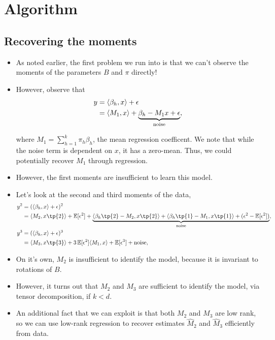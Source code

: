 \documentclass[tablecaption=bottom]{jmlr}
\begin{document}
\section{Algorithm}

\subsection{Recovering the moments}

\begin{itemize}
\item
  As noted earlier, the first problem we run into is that we can't
  observe the moments of the parameters $B$ and $\pi$ directly!
\item
  However, observe that
  \begin{align}
    y &= \langle \beta_h, x \rangle + \epsilon \\
      &= \langle M_1, x \rangle + \underbrace{ {\beta_h - M_1}{x} + \epsilon }_{\textrm{noise}},
  \end{align}

  where $M_1 = \sum_{h=1}^k \pi_h \beta_h$, the mean regression
  coefficent. We note that while the noise term is dependent on $x$, it
  has a zero-mean. Thus, we could potentially recover $M_1$ through
  regression.
\item
  However, the first moments are insufficient to learn this model.
\item
  Let's look at the second and third moments of the data,
  \begin{align*}
    y^2 &= (\innerp{\beta_h}{x} + \epsilon)^2 \\
      &= \innerp{M_2}{x\tp{2}} + \E[\epsilon^2] +
       \underbrace{ \innerp{\beta_h\tp{2} - M_2}{x\tp{2}} + \innerp{\beta_h\tp{1} - M_1}{x\tp{1}} + (\epsilon^2 - \E[\epsilon^2]) }_{\textrm{noise}}, \\
    y^3 &= (\innerp{\beta_h}{x} + \epsilon)^3 \\
      &= \innerp{M_3}{x\tp{3}} + 3\E[\epsilon^2] \innerp{M_1}{x}  + \E[\epsilon^3] + {\textrm{noise}},
  \end{align*}
\item
  On it's own, $M_2$ is insufficient to identify the model, because it
  is invariant to rotations of $B$.
\item
  However, it turns out that $M_2$ and $M_3$ are sufficient to identify
  the model, via tensor decomposition, if $k < d$.
\item
  An additional fact that we can exploit is that both $M_2$ and $M_3$
  are low rank, so we can use low-rank regression to recover estimates
  $\hat M_2$ and $\hat M_3$ efficiently from data.
\end{itemize}
\end{document}
